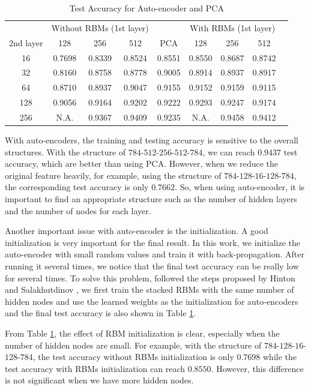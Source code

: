\documentclass[tikz, multi,dvipsnames,svgnames,x11names]{article}
\begin{document}
\begin{table}[htb]
	\centering
	\caption{Test Accuracy for Auto-encoder and PCA}
	\label{table:test_acc_auto}	
	\begin{tabular}{c c c c c c c c c}
		\hline \hline
		 & \multicolumn{3}{c}{Without RBMs (1st layer)} &  & \multicolumn{3}{c}{With RBMs (1st layer)}\\
		\cline{2-4} \cline{6-8}
    2nd layer  &	128    & 256 	& 512    & PCA 	  & 128    & 256 	& 512    \\[0.1cm]
		\hline
		16     &	0.7698 & 0.8339 & 0.8524 & 0.8551 & 0.8550 & 0.8687 & 0.8742 \\[0.1cm]
		32	   &	0.8160 & 0.8758 & 0.8778 & 0.9005 & 0.8914 & 0.8937 & 0.8917 \\[0.1cm]
		64	   &	0.8710 & 0.8937 & 0.9047 & 0.9155 & 0.9152 & 0.9159 & 0.9115 \\[0.1cm]
		128	   &	0.9056 & 0.9164 & 0.9202 & 0.9222 & 0.9293 & 0.9247 & 0.9174 \\[0.1cm]
		256    &	N.A.   & 0.9367 & 0.9409 & 0.9235 & N.A.   & 0.9458 & 0.9412 \\[0.1cm]
		\hline	
	\end{tabular}
\end{table}

With auto-encoders, the training and testing accuracy is sensitive to the overall structures. With the structure of $784$-$512$-$256$-$512$-$784$, we can reach $0.9437$ test accuracy, which are better than using PCA. However, when we reduce the original feature heavily, for example, using the structure of $784$-$128$-$16$-$128$-$784$, the corresponding test accuracy is only $0.7662$. So, when using auto-encoder, it is important to find an appropriate structure such as the number of hidden layers and the number of nodes for each layer.

Another important issue with auto-encoder is the initialization. A good initialization is very important for the final result. In this work, we initialize the auto-encoder with small random values and train it with back-propagation. After running it several times, we notice that the final test accuracy can be really low for several times. To solve this problem, followed the steps proposed by Hinton and Salakhutdinov \cite{hinton2006reducing}, we first train the stacked RBMs with the same number of hidden nodes and use the learned weights as the initialization for auto-encoders and the final test accuracy is also shown in Table \ref{table:test_acc_auto}.

From Table \ref{table:test_acc_auto}, the effect of RBM initialization is clear, especially when the number of hidden nodes are small. For example, with the structure of $784$-$128$-$16$-$128$-$784$, the test accuracy without RBMs initialization is only $0.7698$ while the test accuracy with RBMs initialization can reach $0.8550$. However, this difference is not significant when we have more hidden nodes.
\end{document}

